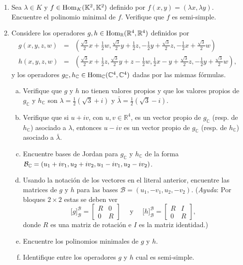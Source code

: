 \begin{enumerate}
    \item Sea $\lambda\in K$ y $f\in\operatorname{Hom}_K(\mathbb{K}^2,\mathbb{K}^2)$ definido por $f(x,y)=(\lambda x,\lambda y)$. Encuentre el polinomio minimal de $f$. Verifique que $f$ es semi-simple.
    
    \item Considere los operadores $g,h\in\operatorname{Hom}_\mathbb{R}(\mathbb{R}^4,\mathbb{R}^4)$ definidos por
    \begin{eqnarray*}
    g(x,y,z,w) & = & (\frac{\sqrt{3}}{2}x+\frac{1}{2}w,\frac{\sqrt{3}}{2}y+\frac{1}{2}z,-\frac{1}{2}y+\frac{\sqrt{3}}{2}z,-\frac{1}{2}x+\frac{\sqrt{3}}{2}w)\\
    h(x,y,z,w) & = & (\frac{\sqrt{3}}{2}x+\frac{1}{2}z,\frac{\sqrt{3}}{2}y+z-\frac{1}{2}w,\frac{1}{2}x-y+\frac{\sqrt{3}}{2}z,-\frac{1}{2}y+\frac{\sqrt{3}}{2}w),
    \end{eqnarray*}
    y los operadores $g_\mathbb{C},h_{\mathbb{C}}\in\operatorname{Hom}_\mathbb{C}(\mathbb{C}^4,\mathbb{C}^4)$ dadas por las mismas f\'ormulas.
    \begin{enumerate}[(a)]
    \item Verifique que $g$ y $h$ no tienen valores propios y que los valores propios de $g_\mathbb{C}$ y $h_\mathbb{C}$ son $\lambda=\frac{1}{2}(\sqrt{3}+i)$ y $\bar{\lambda}=\frac{1}{2}(\sqrt{3}-i)$.
    \item Verifique que si $u+iv$, con $u,v\in\mathbb{R}^4$, es un vector propio de $g_\mathbb{C}$ (resp. de $h_\mathbb{C}$) asociado a $\lambda$, entonces $u-iv$ es un vector propio de $g_\mathbb{C}$ (resp. de $h_\mathbb{C}$) asociado a $\bar{\lambda}$.
    \item Encuentre bases de Jordan para $g_\mathbb{C}$ y $h_\mathbb{C}$ de la forma $\mathcal{B}_{\mathbb{C}}=(u_1+iv_1,u_2+iv_2,u_1-iv_1,u_2-iv_2)$.
    \item Usando la notaci\'on de los vectores en el literal anterior, encuentre las matrices de $g$ y $h$ para las bases $\mathcal{B}=(u_1,-v_1,u_2,-v_2)$.
    (\emph{Ayuda}: Por bloques $2\times 2$ estas se deben ver
    \[
    \Big[g\Big]^\mathcal{B}_\mathcal{B}=\left[\begin{array}{cc} R & 0\\ 0 & R\end{array}\right]\quad\text{ y }\quad\Big[h\Big]^\mathcal{B}_\mathcal{B}=\left[\begin{array}{cc} R & I\\ 0 & R\end{array}\right],
    \]
    donde $R$ es una matriz de rotaci\'on e $I$ es la matriz identidad.)
    \item Encuentre los polinomios minimales de $g$ y $h$.
    \item Identifique entre los operadores $g$ y $h$ cual es semi-simple.
    \end{enumerate}
  \end{enumerate}